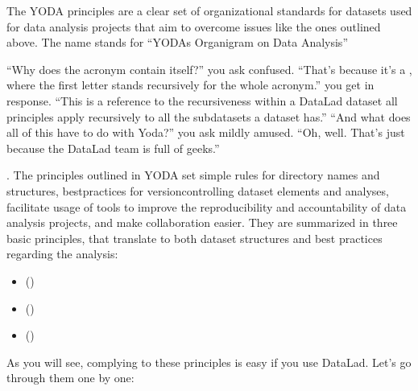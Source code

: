 \sphinxAtStartPar
The YODA principles are a clear set of organizational standards for
datasets used for data analysis projects that aim to overcome issues like the
ones outlined above. The name stands for
“YODAs Organigram on Data Analysis”%
\begin{footnote}\sphinxAtStartFootnote
“Why does the acronym contain itself?” you ask confused.
“That’s because it’s a ,
where the first letter stands recursively for the whole acronym.” you get in response.
“This is a reference to the recursiveness within a DataLad dataset \textendash{} all principles
apply recursively to all the subdatasets a dataset has.”
“And what does all of this have to do with Yoda?” you ask mildly amused.
“Oh, well. That’s just because the DataLad team is full of geeks.”
%
\end{footnote}. The principles outlined
in YODA set simple rules for directory names and structures, best\sphinxhyphen{}practices for
version\sphinxhyphen{}controlling dataset elements and analyses, facilitate
usage of tools to improve the reproducibility and accountability
of data analysis projects, and make collaboration easier.
They are summarized in three basic principles, that translate to both
dataset structures and best practices regarding the analysis:
\begin{itemize}
\item {} 
\sphinxAtStartPar
{\hyperref[\detokenize{basics/101-127-yoda:p1}]{}} ()

\item {} 
\sphinxAtStartPar
{\hyperref[\detokenize{basics/101-127-yoda:p2}]{}} ()

\item {} 
\sphinxAtStartPar
{\hyperref[\detokenize{basics/101-127-yoda:p3}]{}} ()

\end{itemize}

\sphinxAtStartPar
As you will see, complying to these principles is easy if you
use DataLad. Let’s go through them one by one:


